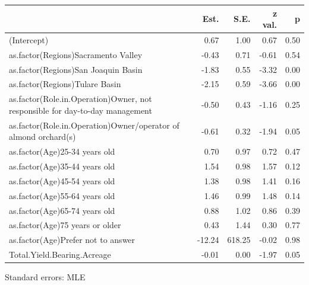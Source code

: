 \documentclass[12pt,]{article}
\newenvironment{Shaded}{\begin{snugshade}}{\end{snugshade}}
\newcommand{\KeywordTok}[1]{\textcolor[rgb]{0.13,0.29,0.53}{\textbf{#1}}}
\newcommand{\StringTok}[1]{\textcolor[rgb]{0.31,0.60,0.02}{#1}}
\newcommand{\CommentTok}[1]{\textcolor[rgb]{0.56,0.35,0.01}{\textit{#1}}}
\newcommand{\NormalTok}[1]{#1}
\begin{document}
\begin{table}[!h]
\centering
\begin{threeparttable}
\begin{tabular}{lrrrr}
\toprule
  & Est. & S.E. & z val. & p\\
\midrule
\rowcolor{gray!6}  (Intercept) & 0.67 & 1.00 & 0.67 & 0.50\\
as.factor(Regions)Sacramento Valley & -0.43 & 0.71 & -0.61 & 0.54\\
\rowcolor{gray!6}  as.factor(Regions)San Joaquin Basin & -1.83 & 0.55 & -3.32 & 0.00\\
as.factor(Regions)Tulare Basin & -2.15 & 0.59 & -3.66 & 0.00\\
\rowcolor{gray!6}  as.factor(Role.in.Operation)Owner, not responsible for day-to-day management & -0.50 & 0.43 & -1.16 & 0.25\\
\addlinespace
as.factor(Role.in.Operation)Owner/operator of almond orchard(s) & -0.61 & 0.32 & -1.94 & 0.05\\
\rowcolor{gray!6}  as.factor(Age)25-34 years old & 0.70 & 0.97 & 0.72 & 0.47\\
as.factor(Age)35-44 years old & 1.54 & 0.98 & 1.57 & 0.12\\
\rowcolor{gray!6}  as.factor(Age)45-54 years old & 1.38 & 0.98 & 1.41 & 0.16\\
as.factor(Age)55-64 years old & 1.46 & 0.99 & 1.48 & 0.14\\
\addlinespace
\rowcolor{gray!6}  as.factor(Age)65-74 years old & 0.88 & 1.02 & 0.86 & 0.39\\
as.factor(Age)75 years or older & 0.43 & 1.44 & 0.30 & 0.77\\
\rowcolor{gray!6}  as.factor(Age)Prefer not to answer & -12.24 & 618.25 & -0.02 & 0.98\\
Total.Yield.Bearing.Acreage & -0.01 & 0.00 & -1.97 & 0.05\\
\bottomrule
\end{tabular}
\begin{tablenotes}
\item Standard errors: MLE
\end{tablenotes}
\end{threeparttable}
\end{table}

\begin{Shaded}
\end{Shaded}
\end{document}
